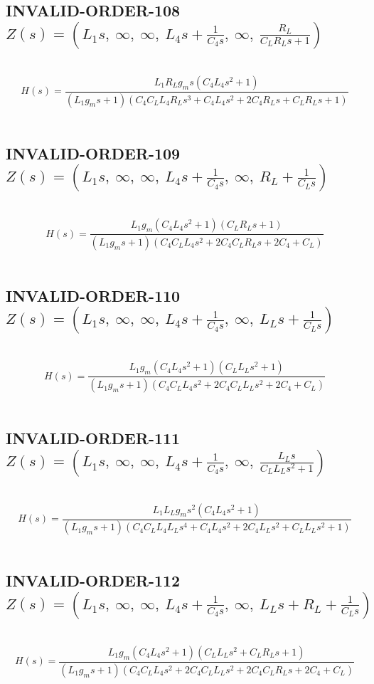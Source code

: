 \documentclass{article}
\begin{document}
\subsection{INVALID-ORDER-108 $Z(s) = \left( L_{1} s, \  \infty, \  \infty, \  L_{4} s + \frac{1}{C_{4} s}, \  \infty, \  \frac{R_{L}}{C_{L} R_{L} s + 1}\right)$ } \ 
\textbf{\[H(s) = \frac{L_{1} R_{L} g_{m} s \left(C_{4} L_{4} s^{2} + 1\right)}{\left(L_{1} g_{m} s + 1\right) \left(C_{4} C_{L} L_{4} R_{L} s^{3} + C_{4} L_{4} s^{2} + 2 C_{4} R_{L} s + C_{L} R_{L} s + 1\right)}\] } \ 
\subsection{INVALID-ORDER-109 $Z(s) = \left( L_{1} s, \  \infty, \  \infty, \  L_{4} s + \frac{1}{C_{4} s}, \  \infty, \  R_{L} + \frac{1}{C_{L} s}\right)$ } \ 
\textbf{\[H(s) = \frac{L_{1} g_{m} \left(C_{4} L_{4} s^{2} + 1\right) \left(C_{L} R_{L} s + 1\right)}{\left(L_{1} g_{m} s + 1\right) \left(C_{4} C_{L} L_{4} s^{2} + 2 C_{4} C_{L} R_{L} s + 2 C_{4} + C_{L}\right)}\] } \ 
\subsection{INVALID-ORDER-110 $Z(s) = \left( L_{1} s, \  \infty, \  \infty, \  L_{4} s + \frac{1}{C_{4} s}, \  \infty, \  L_{L} s + \frac{1}{C_{L} s}\right)$ } \ 
\textbf{\[H(s) = \frac{L_{1} g_{m} \left(C_{4} L_{4} s^{2} + 1\right) \left(C_{L} L_{L} s^{2} + 1\right)}{\left(L_{1} g_{m} s + 1\right) \left(C_{4} C_{L} L_{4} s^{2} + 2 C_{4} C_{L} L_{L} s^{2} + 2 C_{4} + C_{L}\right)}\] } \ 
\subsection{INVALID-ORDER-111 $Z(s) = \left( L_{1} s, \  \infty, \  \infty, \  L_{4} s + \frac{1}{C_{4} s}, \  \infty, \  \frac{L_{L} s}{C_{L} L_{L} s^{2} + 1}\right)$ } \ 
\textbf{\[H(s) = \frac{L_{1} L_{L} g_{m} s^{2} \left(C_{4} L_{4} s^{2} + 1\right)}{\left(L_{1} g_{m} s + 1\right) \left(C_{4} C_{L} L_{4} L_{L} s^{4} + C_{4} L_{4} s^{2} + 2 C_{4} L_{L} s^{2} + C_{L} L_{L} s^{2} + 1\right)}\] } \ 
\subsection{INVALID-ORDER-112 $Z(s) = \left( L_{1} s, \  \infty, \  \infty, \  L_{4} s + \frac{1}{C_{4} s}, \  \infty, \  L_{L} s + R_{L} + \frac{1}{C_{L} s}\right)$ } \ 
\textbf{\[H(s) = \frac{L_{1} g_{m} \left(C_{4} L_{4} s^{2} + 1\right) \left(C_{L} L_{L} s^{2} + C_{L} R_{L} s + 1\right)}{\left(L_{1} g_{m} s + 1\right) \left(C_{4} C_{L} L_{4} s^{2} + 2 C_{4} C_{L} L_{L} s^{2} + 2 C_{4} C_{L} R_{L} s + 2 C_{4} + C_{L}\right)}\] } \ 
\end{document}

